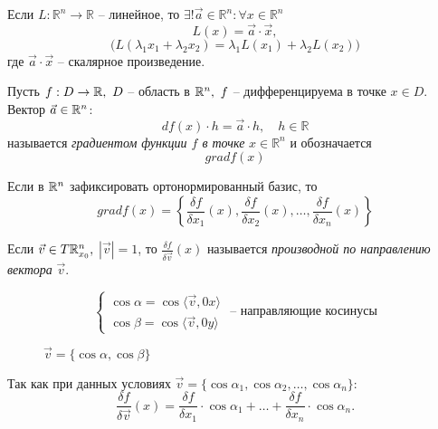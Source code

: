 \begin{statement}
    Если $L:\mathbb{R}^n \rightarrow \mathbb{R}$ -- линейное, то $\exists ! \vec{a}\in \mathbb{R}^n: \forall x \in \mathbb{R}^n$
    \[
        L(x) = \vec{a}\cdot \vec{x},
    \]
    \[
        \big(L(\lambda_1 x_1 + \lambda_2 x_2) = \lambda_1L(x_1) + \lambda_2 L(x_2)\big)
    \]
    где $\vec{a}\cdot \vec{x}$ -- скалярное произведение.
\end{statement}

\begin{definition}
    Пусть $f:D\rightarrow \mathbb{R}, \ D$ -- область в $\mathbb{R}^n, \ f$ -- дифференцируема в точке $x \in D$. Вектор $\vec{a} \in \mathbb{R}^n$:
    \[
        df(x)\cdot h = \vec{a} \cdot h, \quad h \in \mathbb{R}
    \]
    называется \emph{градиентом функции $f$ в точке} $x \in \mathbb{R}^n$ и обозначается
    \[
        gradf(x)
    \]

    Если в $\mathbb{R}^n$ зафиксировать ортонормированный базис, то
    \[
        gradf(x) = \left\{\frac{\delta f}{\delta x_1}(x),\frac{\delta f}{\delta x_2}(x),\ldots,\frac{\delta f}{\delta x_n}(x)\right\}
    \]
\end{definition}

\begin{definition}
    Если $ \vec{v}\in T\mathbb{R}_{x_0}^n, $ $ |\vec{v}| = 1 $, то $ \frac{\delta f}{\delta \vec{v}}(x) $ называется \emph{производной по направлению вектора} $ \vec{v} $.
\end{definition}

\begin{example}
    \[
        \left\{\begin{array}{l}
            \cos\alpha = \cos\langle \vec{v},0x \rangle \\
            \cos\beta = \cos\langle \vec{v},0y \rangle
        \end{array}\right.\text{ -- направляющие косинусы}
    \]
    \begin{figure}[H]
        \centering
        \caption{$ \vec{v}=\{\cos\alpha,\cos\beta\} $}
        \label{fig:fig_01}
    \end{figure}

    Так как при данных условиях $ \vec{v} = \{\cos\alpha_1,\cos\alpha_2,\ldots,\cos\alpha_n\} $:
    \[
        \frac{\delta f}{\delta \vec{v}}(x)=\frac{\delta f}{\delta x_1}\cdot \cos\alpha_1 + \ldots + \frac{\delta f}{\delta x_n}\cdot \cos\alpha_n.
    \]
\end{example}

